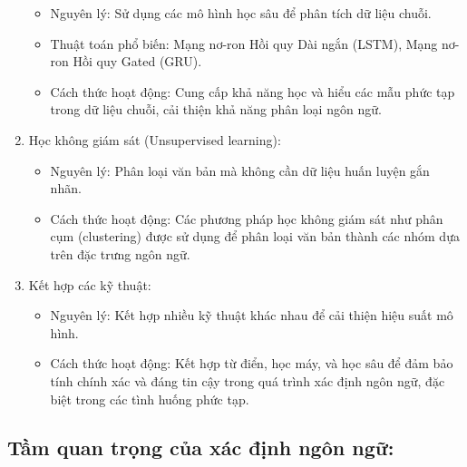 \begin{enumerate}
\begin{itemize}
    \item Nguyên lý: Sử dụng các mô hình học sâu để phân tích dữ liệu chuỗi.
    \item  Thuật toán phổ biến: Mạng nơ-ron Hồi quy Dài ngắn (LSTM), Mạng nơ-ron Hồi quy Gated (GRU).
    \item  Cách thức hoạt động: Cung cấp khả năng học và hiểu các mẫu phức tạp trong dữ liệu chuỗi, cải thiện khả năng phân loại ngôn ngữ.
\end{itemize}
\item  Học không giám sát (Unsupervised learning):
\begin{itemize}
    \item  Nguyên lý: Phân loại văn bản mà không cần dữ liệu huấn luyện gắn nhãn.
    \item Cách thức hoạt động: Các phương pháp học không giám sát như phân cụm (clustering) được sử dụng để phân loại văn bản thành các nhóm dựa trên đặc trưng ngôn ngữ.
\end{itemize}
\item  Kết hợp các kỹ thuật:
\begin{itemize}
    \item Nguyên lý: Kết hợp nhiều kỹ thuật khác nhau để cải thiện hiệu suất mô hình.
    \item Cách thức hoạt động: Kết hợp từ điển, học máy, và học sâu để đảm bảo tính chính xác và đáng tin cậy trong quá trình xác định ngôn ngữ, đặc biệt trong các tình huống phức tạp.
\end{itemize}
\end{enumerate}

\subsection{Tầm quan trọng của xác định ngôn ngữ:}

